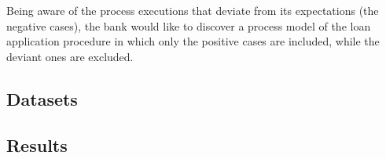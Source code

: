 Being aware of the process executions that deviate from its expectations (the negative cases), the bank would like to discover a process model of the loan application procedure in which only the positive cases are included, while the deviant ones are excluded.


\subsection{Datasets}

\subsection{Results}

